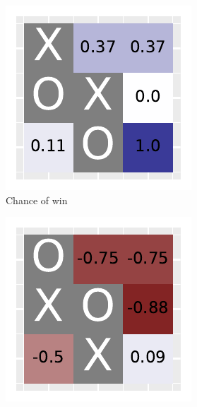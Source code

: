 \documentclass[10pt]{IEEEtran}
\begin{document}
\begin{figure}[h]
     \centering
     \begin{subfigure}[t]{0.32\linewidth}
         \centering
         \includegraphics[width=\linewidth]{code/figures/heatmap_0.pdf}
         \caption{Chance of win}
         \label{fig_heatmap_1}
     \end{subfigure}
     \hfill
     \begin{subfigure}[t]{0.32\linewidth}
         \centering
         \includegraphics[width=\linewidth]{code/figures/heatmap_1.pdf}

\end{subfigure}
\end{figure}
\end{document}

